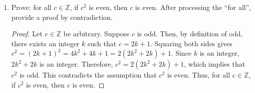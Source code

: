 \documentclass{article}
\begin{document}
\begin{enumerate}
            \newpage

      \item Prove: for all $c \in \mathbb{Z}$, if $c^2$ is even, then $c$ is even. After
            processing the ``for all'', provide a proof by contradiction.

            \begin{proof}
                  Let $c \in \mathbb{Z}$ be arbitrary. Suppose $c$ is odd. Then, by definition of odd, there exists an integer $k$ such that $c = 2k + 1$. Squaring both sides gives $c^2 = (2k + 1)^2 = 4k^2 + 4k + 1 = 2(2k^2 + 2k) + 1$. Since $k$ is an integer, $2k^2 + 2k$ is an integer. Therefore, $c^2 = 2(2k^2 + 2k) + 1$, which implies that $c^2$ is odd. This contradicts the assumption that $c^2$ is even. Thus, for all $c \in \mathbb{Z}$, if $c^2$ is even, then $c$ is even.
            \end{proof}

\end{enumerate}
\end{document}
